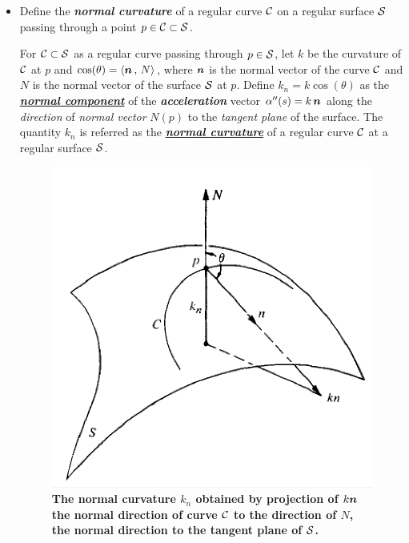\documentclass[11pt]{article}
\begin{document}
\begin{itemize}
\item  Define the \emph{\textbf{normal curvature}} of a regular curve ${\mathcal C}$ on a regular surface ${\mathcal S}$ passing through a point $p\in {\mathcal C} \subset {\mathcal S}$. 
\begin{definition}
For ${\mathcal C} \subset {\mathcal S}$ as a regular curve passing through $p\in {\mathcal S}$, let $k$ be the curvature of ${\mathcal C}$ at $p$ and $\cos(\theta) = \left\langle \boldsymbol{n}\,,\, N \right\rangle$, where $\boldsymbol{n}$ is the normal vector of the curve ${\mathcal C}$ and $N$ is the normal vector of the surface ${\mathcal S}$ at $p$. Define $k_{n} = k\cos(\theta)$ as the \underline{\emph{\textbf{normal component}}} of the \emph{\textbf{acceleration}} vector $\alpha''(s)= k\,\boldsymbol{n}$ along the \emph{direction} of \emph{normal vector} $N(p)$ to the \emph{tangent plane} of the surface. The quantity $k_{n}$ is referred as the \underline{\emph{\textbf{normal curvature}}} of a regular curve ${\mathcal C}$ at a regular surface ${\mathcal S}$. 
\end{definition}
\begin{figure}[thb]
\centering
\begin{minipage}{0.6\linewidth}
 \centerline{\includegraphics[scale = 0.43]{normal_curv.png}}
\end{minipage}
\caption{\scriptsize
\textbf{The normal curvature $k_{n}$ obtained by projection of $k\boldsymbol{n}$ the normal direction of curve ${\mathcal C}$ to the direction of $N$, the normal direction to the tangent plane of ${\mathcal S}$. }}
\end{figure}


\end{itemize}
\end{document}
